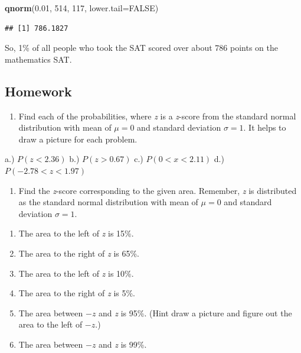 \documentclass[
]{book}
\newenvironment{Shaded}{\begin{snugshade}}{\end{snugshade}}
\newcommand{\DataTypeTok}[1]{\textcolor[rgb]{0.13,0.29,0.53}{#1}}
\newcommand{\DecValTok}[1]{\textcolor[rgb]{0.00,0.00,0.81}{#1}}
\newcommand{\FloatTok}[1]{\textcolor[rgb]{0.00,0.00,0.81}{#1}}
\newcommand{\KeywordTok}[1]{\textcolor[rgb]{0.13,0.29,0.53}{\textbf{#1}}}
\newcommand{\NormalTok}[1]{#1}
\newcommand{\OtherTok}[1]{\textcolor[rgb]{0.56,0.35,0.01}{#1}}
\providecommand{\tightlist}{%
  \setlength{\itemsep}{0pt}\setlength{\parskip}{0pt}}
\begin{document}
\begin{Shaded}
\begin{Highlighting}[]
\KeywordTok{qnorm}\NormalTok{(}\FloatTok{0.01}\NormalTok{, }\DecValTok{514}\NormalTok{, }\DecValTok{117}\NormalTok{, }\DataTypeTok{lower.tail=}\OtherTok{FALSE}\NormalTok{)}
\end{Highlighting}
\end{Shaded}

\begin{verbatim}
## [1] 786.1827
\end{verbatim}

So, 1\% of all people who took the SAT scored over about 786 points on the mathematics SAT.

\hypertarget{homework}{%
\subsection{Homework}\label{homework}}

\begin{enumerate}
\def\labelenumi{\arabic{enumi}.}
\tightlist
\item
  Find each of the probabilities, where \emph{z} is a \emph{z}-score from the standard normal distribution with mean of \(\mu=0\) and standard deviation \(\sigma=1\). It helps to draw a picture for each problem.
\end{enumerate}

a.) \(P(z<2.36)\)
b.) \(P(z>0.67)\)
c.) \(P(0<x<2.11)\)
d.) \(P(-2.78<z<1.97)\)

\begin{enumerate}
\def\labelenumi{\arabic{enumi}.}
\setcounter{enumi}{1}
\tightlist
\item
  Find the \emph{z}-score corresponding to the given area. Remember, \emph{z} is distributed as the standard normal distribution with mean of \(\mu=0\) and standard deviation \(\sigma=1\).
\end{enumerate}

\begin{enumerate}
\def\labelenumi{\alph{enumi}.}
\tightlist
\item
  The area to the left of \emph{z} is 15\%.
\item
  The area to the right of \emph{z} is 65\%.
\item
  The area to the left of \emph{z} is 10\%.
\item
  The area to the right of \emph{z} is 5\%.
\item
  The area between \(-z\) and \emph{z} is 95\%. (Hint draw a picture and figure out the area to the left of \(-z\).)
\item
  The area between \(-z\) and \emph{z} is 99\%.
\end{enumerate}
\end{document}
